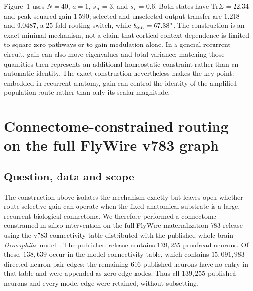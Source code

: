 \documentclass[
  aps,prl,preprint,notitlepage,superscriptaddress,nofootinbib,longbibliography,
  amsmath,amssymb
]{revtex4-2}
\newcommand{\Tr}{\mathrm{Tr}}
\begin{document}
Figure~1 uses $N=40$, $a=1$, $s_H=3$, and $s_L=0.6$. Both states have
$\Tr\Sigma=22.34$ and peak squared gain $1.590$; selected and unselected output
transfer are $1.218$ and $0.0487$, a $25$-fold routing switch, while
$\theta_{\rm out}=67.38^\circ$. The construction
is an exact minimal mechanism, not a claim that cortical context dependence is
limited to square-zero pathways or to gain modulation alone. In a general
recurrent circuit, gain can also move eigenvalues and total variance; matching
those quantities then represents an additional homeostatic constraint rather
than an automatic identity. The exact construction nevertheless makes the key
point: embedded in recurrent anatomy, gain can control the identity of the
amplified population route rather than only its scalar magnitude.

\section{Connectome-constrained routing on the full FlyWire v783 graph}
\label{sec:s-flywire-routing}

\subsection{Question, data and scope}

The construction above isolates the mechanism exactly but leaves open whether
route-selective gain can operate when the fixed anatomical substrate is a large,
recurrent biological connectome.  We therefore performed a connectome-constrained
in silico intervention on the full FlyWire materialization-783 release
~\cite{dorkenwald2024} using the v783 connectivity table distributed with the
published whole-brain \emph{Drosophila} model~\cite{shiu2024}.  The published
release contains $139{,}255$ proofread neurons.  Of these, $138{,}639$ occur in
the model connectivity table, which contains $15{,}091{,}983$ directed
neuron-pair edges; the remaining 616 published neurons have no entry in that
table and were appended as zero-edge nodes.  Thus all $139{,}255$ published
neurons and every model edge were retained, without subsetting.
\end{document}
